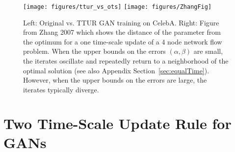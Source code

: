 \documentclass{article}
\begin{document}
\begin{figure} \centering
\texttt{[image: figures/ttur\_vs\_ots]}
\texttt{[image: figures/ZhangFig]}
\caption[Oscillation in GAN training]{Left: Original vs. TTUR GAN training on
CelebA. Right: Figure from Zhang 2007 \cite{Zhang:07} which shows the distance
of the parameter from the optimum for a one time-scale update
of a 4 node network flow problem.
When the upper bounds on the errors $(\alpha,\beta)$ are small,
the iterates oscillate and repeatedly return to a neighborhood of the optimal
solution (see also Appendix
Section~\ref{sec:equalTime}).
However, when the upper bounds on the errors are large, the iterates
typically diverge.
\label{fig:tturvsorig}}
\end{figure}

\section*{Two Time-Scale Update Rule for GANs}
\label{sec:TTUR}
\end{document}
